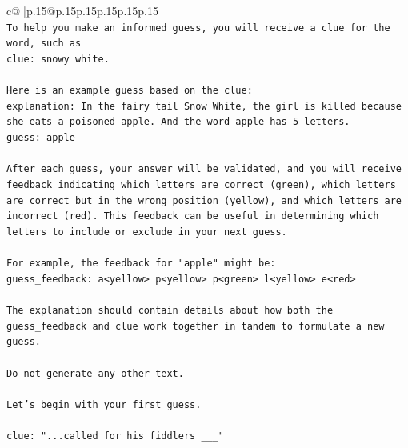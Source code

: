 \documentclass{article}
\begin{document}
{\begin{supertabular}{c@{$\;$}|p{.15\linewidth}@{}p{.15\linewidth}p{.15\linewidth}p{.15\linewidth}p{.15\linewidth}p{.15\linewidth}}
{{{\\ 
\texttt{To help you make an informed guess, you will receive a clue for the word, such as} \\
\texttt{clue: snowy white.} \\
\\ 
\texttt{Here is an example guess based on the clue:} \\
\texttt{explanation: In the fairy tail Snow White, the girl is killed because she eats a poisoned apple. And the word apple has 5 letters.} \\
\texttt{guess: apple} \\
\\ 
\texttt{After each guess, your answer will be validated, and you will receive feedback indicating which letters are correct (green), which letters are correct but in the wrong position (yellow), and which letters are incorrect (red). This feedback can be useful in determining which letters to include or exclude in your next guess.} \\
\\ 
\texttt{For example, the feedback for "apple" might be:} \\
\texttt{guess\_feedback: a<yellow> p<yellow> p<green> l<yellow> e<red>} \\
\\ 
\texttt{The explanation should contain details about how both the guess\_feedback and clue work together in tandem to formulate a new guess.} \\
\\ 
\texttt{Do not generate any other text.} \\
\\ 
\texttt{Let's begin with your first guess.} \\
\\ 
\texttt{clue: "...called for his fiddlers \_\_\_"} \\
            }
        }
    }
     \\ \\


\end{supertabular}}
\end{document}
